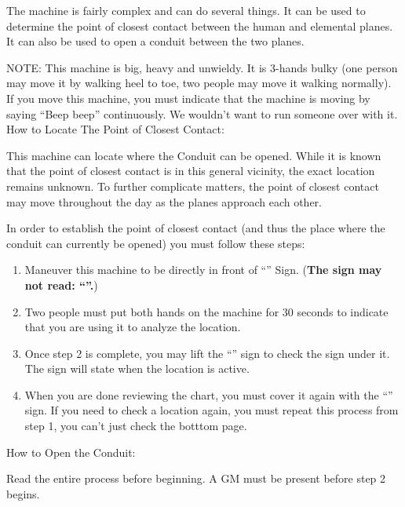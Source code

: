 \documentclass[green]{elementals}
\begin{document}
\name{\gConduitCover{}}


The machine is fairly complex and can do several things. It can be used to determine the point of closest contact between the human and elemental planes. It can also be used to open a conduit between the two planes.

NOTE: This machine is big, heavy and unwieldy. It is 3-hands bulky (one person may move it by walking heel to toe, two people may move it walking normally). If you move this machine, you must indicate that the machine is moving by saying ``Beep beep'' continuously. We wouldn't want to run someone over with it.\\

{\large How to Locate The Point of Closest Contact:}


This machine can locate where the Conduit can be opened. While it is known that the point of closest contact is in this general vicinity, the exact location remains unknown. To further complicate matters, the point of closest contact may move throughout the day as the planes approach each other.

In order to establish the point of closest contact (and thus the place where the conduit can currently be opened) you must follow these steps:
\begin{enumerate}
  \item Maneuver this machine to be directly in front of ``\sLocationCoverSheet{}'' Sign. ({\bf The sign may not read: ``\sSealedLocationSheet{}''.})
  \item Two people must put both hands on the machine for 30 seconds to indicate that you are using it to analyze the location.
  \item Once step 2 is complete, you may lift the ``\sLocationCoverSheet{}'' sign to check the sign under it. The sign will state when the location is active.
  \item When you are done reviewing the chart, you must cover it again with the ``\sLocationCoverSheet{}'' sign. If you need to check a location again, you must repeat this process from step 1, you can't just check the botttom page.
\end{enumerate}

\vspace{10mm}

{\large How to Open the Conduit:}

Read the entire process before beginning. A GM must be present before step 2 begins.
\end{document}

